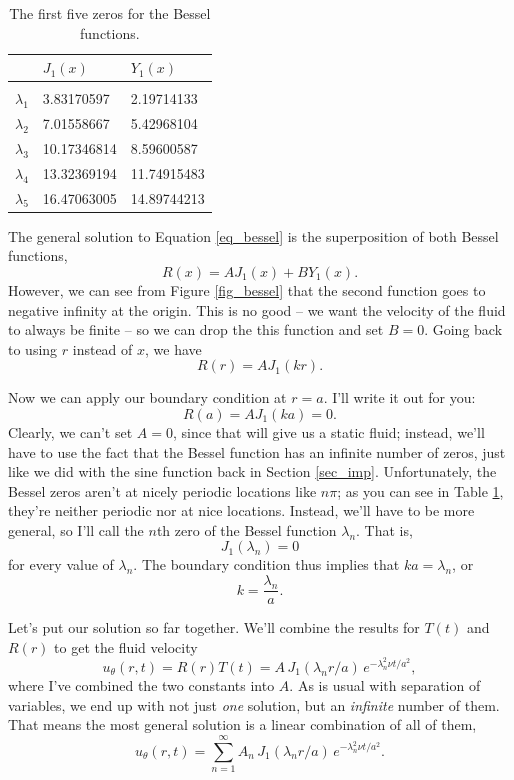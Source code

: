 \begin{table}[t]
\centering
  \begin{tabular}{l|l|l}
  & $J_1(x)$ & $Y_1(x)$ \\
  \hline \\
   $\lambda_1$ & 3.83170597   & 2.19714133    \\
   $\lambda_2$ & 7.01558667 & 5.42968104   \\
   $\lambda_3$ & 10.17346814 & 8.59600587  \\
   $\lambda_4$ & 13.32369194 & 11.74915483 \\
   $\lambda_5$ & 16.47063005 & 14.89744213
  \end{tabular}
  \caption{The first five zeros for the Bessel functions.}
  \label{tab_bessel}
\end{table}

The general solution to Equation \ref{eq_bessel} is the superposition of both Bessel functions, 
\[
R(x) = A J_1(x) + B Y_1(x).
\]
However, we can see from Figure \ref{fig_bessel} that the second function goes to negative infinity at the origin.  This is no good -- we want the velocity of the fluid to always be finite -- so we can drop the this function and set $B=0$.  Going back to using $r$ instead of $x$, we have
\[
R(r) = A J_1(kr).
\]

Now we can apply our boundary condition at $r=a$.  I'll write it out for you:
\[
R(a) = A J_1 (ka) = 0.
\]
Clearly, we can't set $A=0$, since that will give us a static fluid; instead, we'll have to use the fact that the Bessel function has an infinite number of zeros, just like we did with the sine function back in Section \ref{sec_imp}.  Unfortunately, the Bessel zeros aren't at nicely periodic locations like $n\pi$; as you can see in Table \ref{tab_bessel}, they're neither periodic nor at nice locations.  Instead, we'll have to be more general, so I'll call the $n$th zero of the Bessel function $\lambda_n$.  That is, 
\[
J_1(\lambda_n) = 0
\]
for every value of $\lambda_n$.  The boundary condition thus implies that $ka = \lambda_n$, or
\[
k = \frac{\lambda_n }{a}.
\]

Let's put our solution so far together.  We'll combine the results for $T(t)$ and $R(r)$ to get the fluid velocity
\[
u_\theta(r, t) = R(r) T(t) = A \, J_1(\lambda_n r / a) \, e^{-\lambda_n^2 \nu t /a^2},
\]
where I've combined the two constants into $A$.  As is usual with separation of variables, we end up with not just \emph{one} solution, but an \emph{infinite} number of them.  That means the most general solution is a linear combination of all of them,
\begin{equation}
u_\theta(r, t) = \sum_{n=1}^\infty A_n \, J_1(\lambda_n r / a) \, e^{-\lambda_n^2 \nu t /a^2}.
\end{equation}

